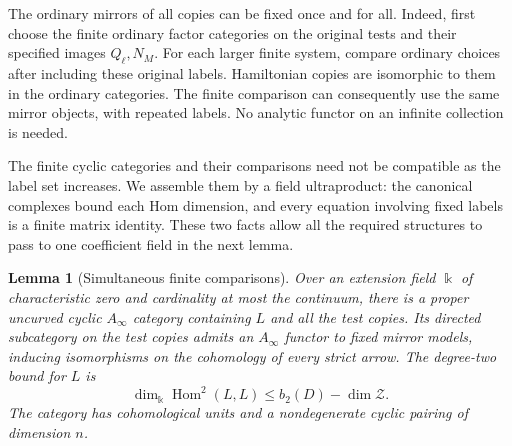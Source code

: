 \documentclass[11pt]{article}
\numberwithin{equation}{section}
\newtheorem{lemma}[theorem]{Lemma}
\theoremstyle{definition}
\theoremstyle{remark}
\DeclareMathOperator{\Hom}{Hom}
\begin{document}
The ordinary mirrors of all copies can be fixed once and for all.
Indeed, first choose the finite ordinary factor categories on the
original tests and their specified images $Q_\ell,N_M$.  For each larger
finite system, compare ordinary choices after including these original
labels.  Hamiltonian copies are isomorphic to them in the ordinary
categories.  The finite comparison can consequently use the same
mirror objects, with repeated labels.  No analytic functor on an
infinite collection is needed.

The finite cyclic categories and their comparisons need not be
compatible as the label set increases.  We assemble them by a field
ultraproduct: the canonical complexes bound each Hom dimension, and
every equation involving fixed labels is a finite matrix identity.
These two facts allow all the required structures to pass to one
coefficient field in the next lemma.

\begin{lemma}[Simultaneous finite comparisons]
\label{realization:field}
Over an extension field $\Bbbk$ of characteristic zero and cardinality
at most the continuum, there is a proper uncurved cyclic
$A_\infty$ category containing $L$ and all the test copies.  Its
directed subcategory on the test copies admits an $A_\infty$ functor to fixed mirror
models, inducing isomorphisms on the cohomology of every strict arrow.
The degree-two bound for $L$ is
\begin{equation}
 \dim_{\Bbbk}\Hom^2(L,L)
 \le b_2(D)-\dim\mathcal Z.
 \label{realization:ambient-bound}
\end{equation}
The category has cohomological units and a nondegenerate cyclic pairing
of dimension $n$.
\end{lemma}
\end{document}
